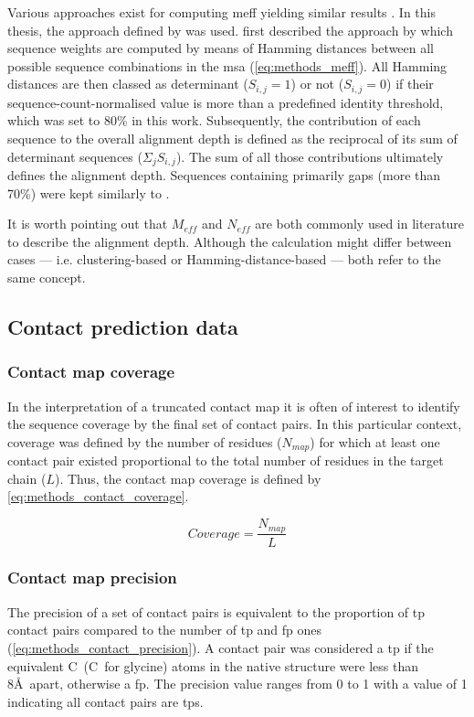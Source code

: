 Various approaches exist for computing \gls{meff} \cite{Morcos2011-lk,Jones2012-ks,Ekeberg2014-kf,Jones2015-vq} yielding similar results \cite{Skwark2014-qp}. In this thesis, the approach defined by \textcite{Morcos2011-lk} was used. \textcite{Morcos2011-lk} first described the approach by which sequence weights are computed by means of Hamming distances between all possible sequence combinations in the \gls{msa} (\cref{eq:methods_meff}). All Hamming distances are then classed as determinant ($S_{i,j}=1$) or not ($S_{i,j}=0$) if their sequence-count-normalised value is more than a predefined identity threshold, which was set to 80\% in this work. Subsequently, the contribution of each sequence to the overall alignment depth is defined as the reciprocal of its sum of determinant sequences ($\Sigma_{j} S_{i,j}$). The sum of all those contributions ultimately defines the alignment depth. Sequences containing primarily gaps (more than 70\%) were kept similarly to \textcite{Morcos2011-lk,Ekeberg2014-kf}.

It is worth pointing out that $M_{eff}$ and $N_{eff}$ are both commonly used in literature to describe the alignment depth. Although the calculation might differ between cases --- i.e. clustering-based or Hamming-distance-based --- both refer to the same concept.

\subsection{Contact prediction data}
\subsubsection{Contact map coverage}
In the interpretation of a truncated contact map it is often of interest to identify the sequence coverage by the final set of contact pairs. In this particular context, coverage was defined by the number of residues ($N_{map}$) for which at least one contact pair existed proportional to the total number of residues in the target chain ($L$). Thus, the contact map coverage is defined by \cref{eq:methods_contact_coverage}.

\begin{equation}
    Coverage=\frac{N_{map}}{L}
    \label{eq:methods_contact_coverage}
\end{equation}

\subsubsection{Contact map precision} \label{sec:methods_contact_map_prec} 
The precision of a set of contact pairs is equivalent to the proportion of \gls{tp} contact pairs compared to the number of \gls{tp} and \gls{fp} ones (\cref{eq:methods_contact_precision}). A contact pair was considered a \gls{tp} if the equivalent C\textbeta\ (C\textalpha\ for glycine) atoms in the native structure were less than 8\AA\ apart, otherwise a \gls{fp}. The precision value ranges from 0 to 1 with a value of 1 indicating all contact pairs are \gls{tp}s. 

